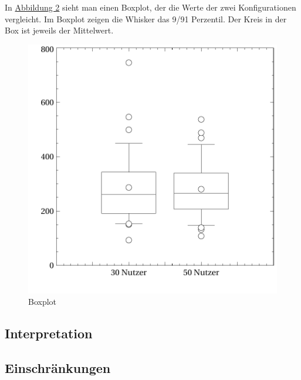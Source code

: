 In \hyperref[fig:boxplot]{Abbildung 2} sieht man einen Boxplot, der die Werte der zwei Konfigurationen vergleicht. Im Boxplot zeigen die Whisker das 9/91 Perzentil. Der Kreis in der Box ist jeweils der Mittelwert.

\begin{figure}[H]
	\includegraphics[width=\linewidth]{graphics/boxplots.pdf}
	\caption{Boxplot}
	\label{fig:boxplot}	
\end{figure}


\subsection{Interpretation}

\subsection{Einschränkungen}
